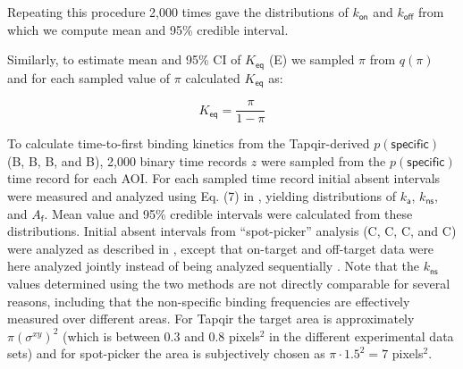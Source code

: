 Repeating this procedure 2,000 times gave the distributions of $k_\mathsf{on}$ and $k_\mathsf{off}$ from which we compute mean and 95\% credible interval.

Similarly, to estimate mean and 95\% CI of $K_\mathsf{eq}$ (E) we sampled $\pi$ from $q(\pi)$ and for each sampled value of $\pi$ calculated $K_\mathsf{eq}$ as:

\begin{equation}
    K_\mathsf{eq} = \dfrac{\pi}{1 - \pi}
\end{equation}

To calculate  time-to-first binding kinetics from the Tapqir-derived $p(\mathsf{specific})$ (B, B, B, and B), 2,000 binary time records $z$ were sampled from the $p(\mathsf{specific})$ time record for each AOI. For each sampled time record initial absent intervals were measured and analyzed using Eq. (7) in \cite{Friedman2015-nx}, yielding distributions of $k_\mathsf{a}$, $k_\mathsf{ns}$, and $A_\mathsf{f}$. Mean value and 95\% credible intervals were calculated from these distributions. Initial absent intervals from ``spot-picker'' analysis (C, C, C, and C) were analyzed as described in \citep{Friedman2015-nx}, except that on-target and off-target data were here analyzed jointly instead of being analyzed sequentially \citep{Friedman2015-nx}.  Note that the $k_\mathsf{ns}$ values determined using the two methods are not directly comparable for several reasons, including that the non-specific binding frequencies are effectively measured over different areas. For Tapqir the target area is approximately $ \pi \left( \sigma^{xy} \right) ^2$ (which is between 0.3 and 0.8 pixels$^2$ in the different experimental data sets) and for spot-picker the area is subjectively chosen as $\pi \cdot 1.5^2 = 7$ pixels$^2$.







\clearpage